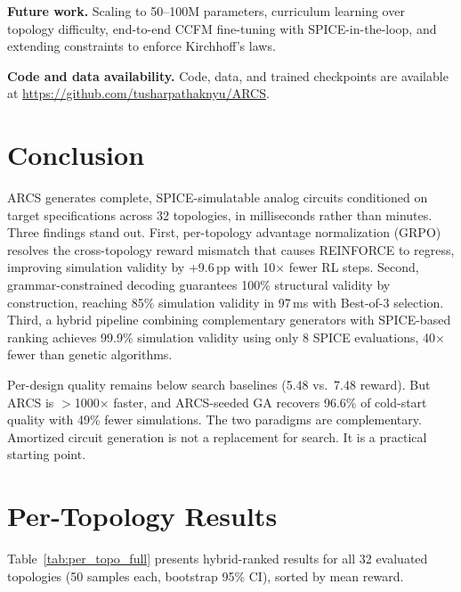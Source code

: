 \documentclass[conference]{IEEEtran}
\begin{document}
\textbf{Future work.}
Scaling to 50--100M parameters, curriculum learning over topology
difficulty, end-to-end CCFM fine-tuning with SPICE-in-the-loop, and
extending constraints to enforce Kirchhoff's laws.

\textbf{Code and data availability.} Code, data, and trained checkpoints
are available at \url{https://github.com/tusharpathaknyu/ARCS}.

\section{Conclusion}
\label{sec:conclusion}

ARCS generates complete, SPICE-simulatable analog circuits conditioned
on target specifications across 32 topologies, in milliseconds rather
than minutes. Three findings stand out. First, per-topology advantage
normalization (GRPO) resolves the cross-topology reward mismatch that
causes REINFORCE to regress, improving simulation validity by +9.6\,pp
with 10$\times$ fewer RL steps. Second, grammar-constrained decoding
guarantees 100\% structural validity by construction, reaching 85\%
simulation validity in 97\,ms with Best-of-3 selection. Third, a hybrid
pipeline combining complementary generators with SPICE-based ranking
achieves 99.9\% simulation validity using only 8 SPICE
evaluations, 40$\times$ fewer than genetic algorithms.

Per-design quality remains below search baselines (5.48 vs.\ 7.48
reward). But ARCS is $>$1000$\times$ faster, and ARCS-seeded GA
recovers 96.6\% of cold-start quality with 49\% fewer simulations.
The two paradigms are complementary. Amortized circuit generation is
not a replacement for search. It is a practical starting point.

\appendix
\section{Per-Topology Results}
\label{app:per_topology}

Table~\ref{tab:per_topo_full} presents hybrid-ranked results
for all 32 evaluated topologies (50 samples each, bootstrap 95\% CI),
sorted by mean reward.
\end{document}

